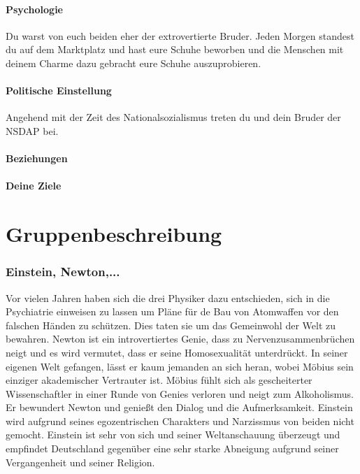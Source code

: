 \documentclass[12pt, a4paper, openany]{report}
\begin{document}
\subsubsection{Psychologie}
Du warst von euch beiden eher der extrovertierte Bruder. Jeden Morgen standest du auf dem Marktplatz und hast eure Schuhe beworben und die Menschen mit deinem Charme dazu gebracht eure Schuhe auszuprobieren. 

\subsubsection{Politische Einstellung}
Angehend mit der Zeit des Nationalsozialismus treten du und dein Bruder der NSDAP bei. 

\subsubsection{Beziehungen}

\subsubsection{Deine Ziele}


\chapter{Gruppenbeschreibung}

\subsection{Einstein, Newton,...}
Vor vielen Jahren haben sich die drei Physiker dazu entschieden, sich in die Psychiatrie einweisen zu lassen um Pläne für de Bau von Atomwaffen vor den falschen Händen zu schützen. 
Dies taten sie um das Gemeinwohl der Welt zu bewahren.
Newton ist ein introvertiertes Genie, dass zu Nervenzusammenbrüchen neigt und es wird vermutet, dass er seine Homosexualität unterdrückt. 
In seiner eigenen Welt gefangen, lässt er kaum jemanden an sich heran, wobei Möbius sein einziger akademischer Vertrauter ist. 
Möbius fühlt sich als gescheiterter Wissenschaftler in einer Runde von Genies verloren und neigt zum Alkoholismus. 
Er bewundert Newton und genießt den Dialog und die Aufmerksamkeit. 
Einstein wird aufgrund seines egozentrischen Charakters und Narzissmus von beiden nicht gemocht. 
Einstein ist sehr von sich und seiner Weltanschauung überzeugt und empfindet Deutschland gegenüber eine sehr starke Abneigung aufgrund seiner Vergangenheit und seiner Religion. 
\end{document}
